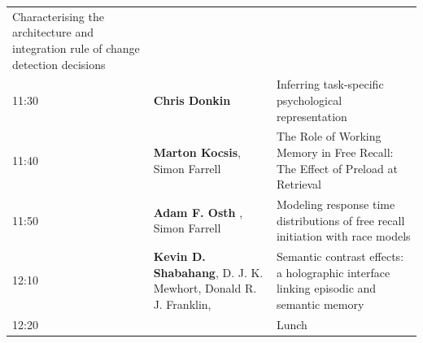 \documentclass[]{article}
\begin{document}
\begin{longtable}[]{@{}lll@{}}
\begin{minipage}[t]{0.53\columnwidth}
Characterising the architecture and integration rule of change detection
decisions\strut
\end{minipage}\tabularnewline
\begin{minipage}[t]{0.03\columnwidth}\raggedright\strut
11:30\strut
\end{minipage} & \begin{minipage}[t]{0.35\columnwidth}\raggedright\strut
\textbf{Chris Donkin}\strut
\end{minipage} & \begin{minipage}[t]{0.53\columnwidth}\raggedright\strut
Inferring task-specific psychological representation\strut
\end{minipage}\tabularnewline
\begin{minipage}[t]{0.03\columnwidth}\raggedright\strut
11:40\strut
\end{minipage} & \begin{minipage}[t]{0.35\columnwidth}\raggedright\strut
\textbf{Marton Kocsis}, Simon Farrell\strut
\end{minipage} & \begin{minipage}[t]{0.53\columnwidth}\raggedright\strut
The Role of Working Memory in Free Recall: The Effect of Preload at
Retrieval\strut
\end{minipage}\tabularnewline
\begin{minipage}[t]{0.03\columnwidth}\raggedright\strut
11:50\strut
\end{minipage} & \begin{minipage}[t]{0.35\columnwidth}\raggedright\strut
\textbf{Adam F. Osth} , Simon Farrell\strut
\end{minipage} & \begin{minipage}[t]{0.53\columnwidth}\raggedright\strut
Modeling response time distributions of free recall initiation with race
models\strut
\end{minipage}\tabularnewline
\begin{minipage}[t]{0.03\columnwidth}\raggedright\strut
12:10\strut
\end{minipage} & \begin{minipage}[t]{0.35\columnwidth}\raggedright\strut
\textbf{Kevin D. Shabahang}, D. J. K. Mewhort, Donald R. J.
Franklin,\strut
\end{minipage} & \begin{minipage}[t]{0.53\columnwidth}\raggedright\strut
Semantic contrast effects: a holographic interface linking episodic and
semantic memory\strut
\end{minipage}\tabularnewline
\begin{minipage}[t]{0.03\columnwidth}\raggedright\strut
12:20\strut
\end{minipage} & \begin{minipage}[t]{0.35\columnwidth}\raggedright\strut
\strut
\end{minipage} & \begin{minipage}[t]{0.53\columnwidth}\raggedright\strut
Lunch\strut
\end{minipage}\tabularnewline
\bottomrule
\end{longtable}
\end{document}

